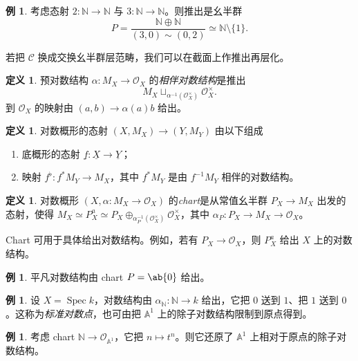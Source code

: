 \documentclass{amsart}
\theoremstyle{definition}
\newtheorem{defn}[thm]{定义}
\newtheorem{exm}[thm]{例}
\theoremstyle{remark}
\theoremstyle{plain}
\theoremstyle{definition}
\theoremstyle{remark}
\newcommand{\A}{\mathbb{A}}
\newcommand{\N}{\mathbb{N}}
\newcommand{\mc}[1]{\mathcal{#1}}
\newcommand{\ul}[1]{\underline{#1}}
\newcommand{\1}{\mathbf{1}}
\newcommand{\2}{\mathbf{2}}
\newcommand{\3}{\mathbf{3}}
\DeclareMathOperator{\Spec}{Spec}
\begin{document}
\begin{exm}
    考虑态射 \(2 \colon \N \to \N\) 与 \(3 \colon \N \to \N\)。则推出是幺半群
    \[ P = \frac{\N \oplus \N}{(3, 0) \sim (0,2)} \simeq \N \setminus \{1\}. \]
\end{exm}

若把 \(\mc{C}\) 换成交换幺半群层范畴，我们可以在截面上作推出再层化。

\begin{defn}
    预对数结构 \(\alpha \colon M_X \to \mc{O}_X\) 的\textit{相伴对数结构}是推出
    \[ M_X \sqcup_{\alpha^{-1}(\mc{O}_X^{\times})} \mc{O}_X^{\times}. \]
    到 \(\mc{O}_X\) 的映射由 \((a,b) \to \alpha(a) b\) 给出。
\end{defn}

\begin{defn}
    对数概形的态射 \((X, M_X) \to (Y, M_Y)\) 由以下组成
    \begin{enumerate}
        \item 底概形的态射 \(\ul{f} \colon \ul{X} \to \ul{Y}\)；
        \item 映射 \(f^{\flat} \colon f^* M_Y \to M_X\)，其中 \(f^* M_Y\) 是由 \(f^{-1} M_Y\) 相伴的对数结构。
    \end{enumerate}
\end{defn}

\begin{defn}
    对数概形 \((X, \alpha \colon M_X \to \mc{O}_X)\) 的\textit{chart}是从常值幺半群 \(P_X \to M_X\) 出发的态射，使得 \(M_X \simeq P_X^a \simeq P_X \oplus_{\alpha_P^{-1}(\mc{O}_X^{\times})} \mc{O}_X^{\times}\)，其中 \(\alpha_P \colon P_X \to M_X \to \mc{O}_X\)。
\end{defn}

Chart 可用于具体给出对数结构。例如，若有 \(P_X \to \mc{O}_X\)，则 \(P_X^a\) 给出 \(X\) 上的对数结构。

\begin{exm}
    平凡对数结构由 chart \(P = \ab\{0\}\) 给出。
\end{exm}

\begin{exm}
    设 \(X = \Spec k\)，对数结构由 \(\alpha_{\N} \colon \N \to k\) 给出，它把 \(0\) 送到 \(1\)、把 \(1\) 送到 \(0\)。这称为\textit{标准对数点}，也可由把 \(\A^1\) 上的除子对数结构限制到原点得到。
\end{exm}

\begin{exm}
    考虑 chart \(\N \to \mc{O}_{\A^1}\)，它把 \(n \mapsto t^n\)。则它还原了 \(\A^1\) 上相对于原点的除子对数结构。
\end{exm}
\end{document}
